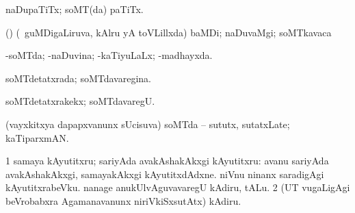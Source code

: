 \bentry
{} 
\gl{\nA}
\expl{}
\bmng
{} 
\emng
\eentry

\bentry
{} 
\gl{\nA}
\expl{}
\bmng
naDupaTiTx; soMT(da) paTiTx. 
\emng
\eentry

\bentry
{} 
\gl{\nA}
\expl{}
\bmng
{} 
\emng
\eentry

\bentry
{} 
\gl{\nA}
\expl{}
\bmng
(\birx) (\sA\ guMDigaLiruva, kAlru yA toVLillxda) baMDi; naDuvaMgi; soMTkavaca 
\emng
\eentry

\bentry
{} 
\gl{\gu}
\expl{}
\bmng
{} 
\emng
\eentry

\bentry
{} 
\gl{\kirxvi}
\expl{}
\bmng
{} 
\emng
\eentry

\bentry
{}
\gl{\gu}
\expl{}
\bmng
-soMTda; -naDuvina; -kaTiyuLaLx; -madhayxda. 
\emng
\eentry

\bentry
{} 
\gl{\gu}
\expl{}
\bmng
soMTdetatxrada; soMTdavaregina. 
\emng
\eentry

\bentry
{} 
\gl{\kirxvi}
\expl{}
\bmng
soMTdetatxrakekx; soMTdavaregU. 
\emng
\eentry

\bentry
{} 
\gl{\nA}
\expl{}
\bmng
(vayxkitxya dapapxvanunx sUcisuva) soMTda -- sututx, sutatxLate; kaTiparxmAN. 
\emng
\eentry

\bentry
{} 
\gl{\sakirx}
\expl{}
\bmng
\bnum
\num{1} samaya kAyutitxru; sariyAda avakAshakAkxgi kAyutitxru:  avanu sariyAda avakAshakAkxgi, samayakAkxgi kAyutitxdAdxne.  niVnu ninanx saradigAgi kAyutitxrabeVku.  nanage anukUlvAguvavaregU kAdiru, tALu. 
\num{2} (UT \mo vugaLigAgi beVrobabxra Agamanavanunx niriVkiSxsutAtx) kAdiru. 
\enum
\emng

